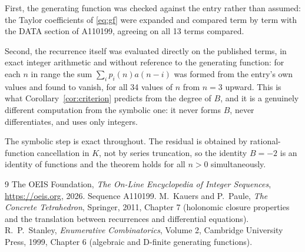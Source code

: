 \documentclass[11pt,a4paper]{article}
\theoremstyle{plain}
\theoremstyle{definition}
\begin{document}
First, the generating function was checked against the entry rather than assumed: the
Taylor coefficients of \eqref{eq:gf} were expanded and compared term by term with the DATA
section of A110199, agreeing on all 13 terms compared.

Second, the recurrence itself was evaluated directly on the published terms, in exact
integer arithmetic and without reference to the generating function: for each $n$ in range
the sum $\sum_{i}p_{i}(n)a(n-i)$ was formed from the entry's own values and found to
vanish, for all 34 values of $n$ from $n=3$ upward. This is what
Corollary~\ref{cor:criterion} predicts from the degree of $B$, and it is a genuinely
different computation from the symbolic one: it never forms $B$, never differentiates, and
uses only integers.

The symbolic step is exact throughout. The residual is obtained by rational-function
cancellation in $K$, not by series truncation, so the identity $B=-2$ is an
identity of functions and the theorem holds for all $n>0$ simultaneously.

\begin{thebibliography}{9}
 The OEIS Foundation, \emph{The On-Line Encyclopedia of Integer Sequences},
\url{https://oeis.org}, 2026. Sequence A110199.
 M.~Kauers and P.~Paule, \emph{The Concrete Tetrahedron}, Springer, 2011,
Chapter 7 (holonomic closure properties and the translation between recurrences and
differential equations).
 R.~P.~Stanley, \emph{Enumerative Combinatorics}, Volume 2, Cambridge
University Press, 1999, Chapter 6 (algebraic and D-finite generating functions).
\end{thebibliography}
\end{document}
